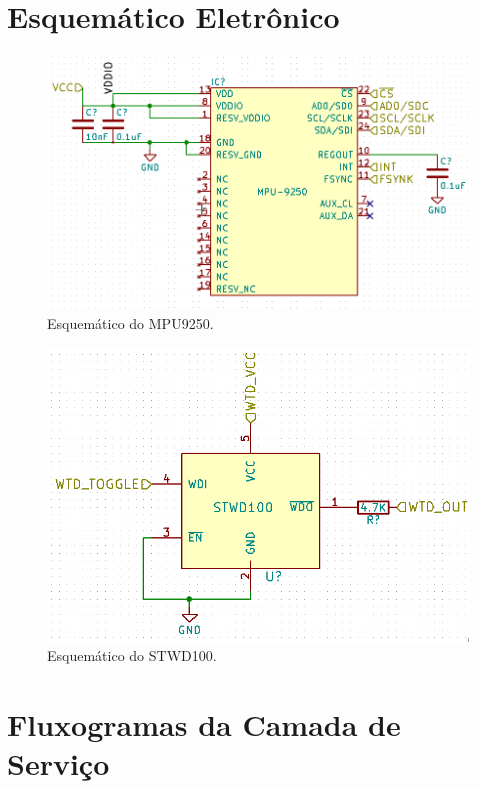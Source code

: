 \begin{apendicesenv}
\chapter{Esquemático Eletrônico}
\label{apendicee}


\begin{figure}[!h]
\centerfloat
	\centering
\includegraphics[keepaspectratio=true,scale=0.5]{figuras/mpu9250_esquema.PNG}
	\caption{Esquemático do MPU9250.}
	\label{apendMPU}
\end{figure}

\begin{figure}[!h]
\centerfloat
	\centering
\includegraphics[keepaspectratio=true,scale=0.5]{figuras/wtd_esquema.PNG}
	\caption{Esquemático do STWD100.}
	\label{STWD}
\end{figure}

\chapter{Fluxogramas da Camada de Serviço}
\label{apendicef}


\end{apendicesenv}
